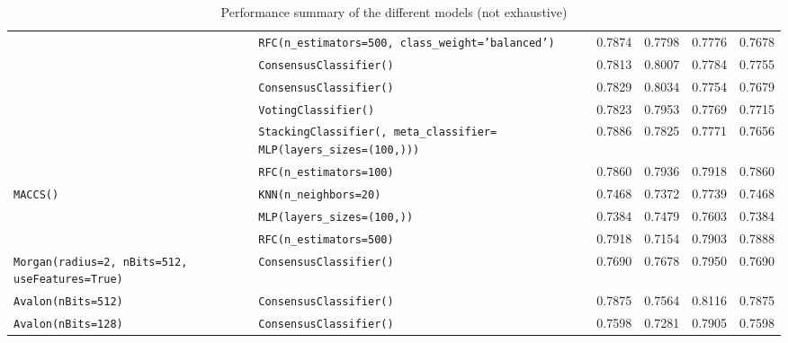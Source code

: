 \begin{table}[H]
{\begin{tabular}{|p{4cm}|p{5cm}|c|c|c|c|}
    	                                                                              & \texttt{RFC(n\_estimators=500, class\_weight='balanced')} & \num{0.7874} & \num{0.7798} & \num{0.7776} & \num{0.7678} \\ \cline{2-6}
    	                                                                              & \texttt{ConsensusClassifier(\footnotemark[1])} & \num{0.7813} & \num{0.8007} & \num{0.7784} & \num{0.7755}‬  \\ \cline{2-6}
    	                                                                              & \rowcolor{blue!25} \texttt{ConsensusClassifier(\footnotemark[2])} & \num{0.7829} & \num{0.8034} & \num{0.7754} & \num{0.7679}‬ \\ \cline{2-6}
    	                                                                              & \texttt{VotingClassifier(\footnotemark[1])}    & \num{0.7823} & \num{0.7953} & \num{0.7769} & \num{0.7715} \\ \cline{2-6}
    	                                                                              & \texttt{StackingClassifier(\footnotemark[1], meta\_classifier= MLP(layers\_sizes=(100,)))}  & \num{0.7886} & \num{0.7825} & \num{0.7771} & \num{0.7656} \\ \cline{2-6}
    	                                                                              & \rowcolor{blue!25} \texttt{RFC(n\_estimators=100)}\footnotemark[3] & \num{0.7860} & \num{0.7936} & \num{0.7918} & \num{0.7860} \\ \hline\hline
    	\multirow{3}{4cm}{\texttt{MACCS()}}                                           & \texttt{KNN(n\_neighbors=20)}                 & \num{0.7468} & \num{0.7372} & \num{0.7739} & \num{0.7468} \\ \cline{2-6}
    	                                                                              & \texttt{MLP(layers\_sizes=(100,))}            & \num{0.7384} & \num{0.7479} & \num{0.7603} & \num{0.7384} \\ \cline{2-6}
    	                                                                              & \texttt{RFC(n\_estimators=500)}               & \num{0.7918} & \num{0.7154} & \num{0.7903} & \num{0.7888} \\ \hline\hline
        \texttt{Morgan(radius=2, nBits=512, useFeatures=True)}                        & \texttt{ConsensusClassifier(\footnotemark[2])} & \num{0.7690} & \num{0.7678} & \num{0.7950} & \num{0.7690}  \\ \hline
    	\texttt{Avalon(nBits=512)}                                                    & \texttt{ConsensusClassifier(\footnotemark[2])} & \num{0.7875} & \num{0.7564} & \num{0.8116} & \num{0.7875}  \\ \hline 
    	\texttt{Avalon(nBits=128)}                                                    & \texttt{ConsensusClassifier(\footnotemark[2])} & \num{0.7598} & \num{0.7281} & \num{0.7905} & \num{0.7598}  \\ \hline 
    \end{tabular}}
    \caption{Performance summary of the different models (not exhaustive)}
    \label{tab:performance.summary}
\end{table}

